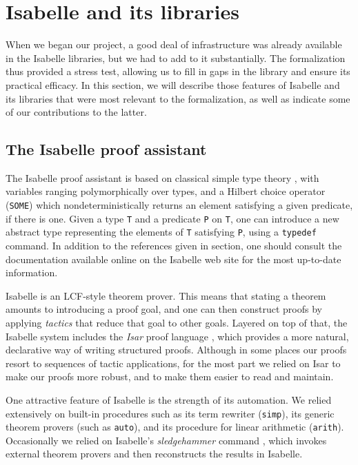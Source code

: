 \documentclass{svjour3}
\begin{document}
\section{Isabelle and its libraries}
\label{section:isabelle}

When we began our project, a good deal of infrastructure was already available in the Isabelle libraries, but we had to add to it substantially. The formalization thus provided a stress test, allowing us to fill in gaps in the library and ensure its practical efficacy. In this section, we will describe those features of Isabelle and its libraries that were most relevant to the formalization, as well as indicate some of our contributions to the latter.

\subsection{The Isabelle proof assistant}

The Isabelle proof assistant \cite{nipkow:et:al:02} is based on classical simple type theory \cite{church:40}, with variables ranging polymorphically over types, and a Hilbert choice operator (\texttt{SOME}) which nondeterministically returns an element satisfying a given predicate, if there is one. Given a type \texttt{T} and a predicate \texttt{P} on \texttt{T}, one can introduce a new abstract type representing the elements of \texttt{T} satisfying \texttt{P}, using a \texttt{typedef} command. In addition to the references given in section, one should consult the documentation available online on the Isabelle web site for the most up-to-date information.

Isabelle is an LCF-style theorem prover. This means that stating a theorem amounts to introducing a proof goal, and one can then construct proofs by applying \emph{tactics} that reduce that goal to other goals. Layered on top of that, the Isabelle system includes the \emph{Isar} proof language \cite{wenzel:02}, which provides a more natural, declarative way of writing structured proofs. Although in some places our proofs resort to sequences of tactic applications, for the most part we relied on Isar to make our proofs more robust, and to make them easier to read and maintain.

One attractive feature of Isabelle is the strength of its automation. We relied extensively on built-in procedures such as its term rewriter (\texttt{simp}), its generic theorem provers (such as \texttt{auto}), and its procedure for linear arithmetic (\texttt{arith}). Occasionally we relied on Isabelle's \emph{sledgehammer} command \cite{paulson:10}, which invokes external theorem provers and then reconstructs the results in Isabelle.
\end{document}
